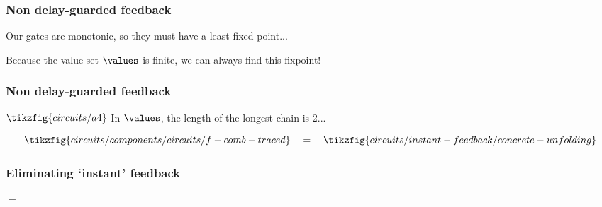 \begin{frame}
    \frametitle{Non delay-guarded feedback}

    \wait

    Our gates are \alert{monotonic}, so they must have a \alert{least fixed point}...

    \wait

    Because the value set \(\values\) is finite, we can always find this fixpoint!    
    
\end{frame}

\begin{frame}
    \frametitle{Non delay-guarded feedback}

    \(
        \tikzfig{circuits/a4}    
    \)
    \quad
    In \(\values\), the length of the longest chain is \alert{2}...

    \wait

    \[
        \tikzfig{circuits/components/circuits/f-comb-traced}
        \quad=\quad
        \tikzfig{circuits/instant-feedback/concrete-unfolding}
    \]
    

\end{frame}

\begin{frame}
    \frametitle{Eliminating `instant' feedback}

    \begin{center}
        \begin{minipage}{0.25\textwidth}
            \quad\(=\)
        \end{minipage}
        \begin{minipage}{0.4\textwidth}
        \end{minipage}
    \end{center}
\end{frame}

